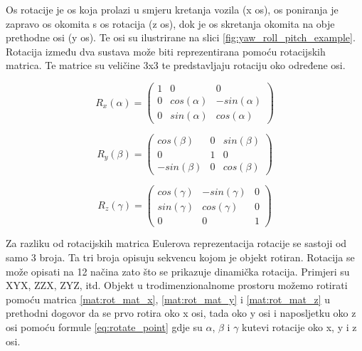 Os rotacije je os koja prolazi u smjeru kretanja vozila (x os), os poniranja je zapravo os okomita s os rotacija (z os), dok je os skretanja okomita na obje prethodne osi (y os). Te osi su ilustrirane na slici \ref{fig:yaw_roll_pitch_example}. Rotacija između dva sustava može biti reprezentirana pomoću rotacijskih matrica\cite{wiki:Rotation_matrix}. Te matrice su veličine 3x3 te predstavljaju rotaciju oko određene osi.
\pagebreak

\begin{equation}
  R_{x}(\alpha) =
  \begin{pmatrix}
    1 & 0 & 0\\
    0 & cos(\alpha) & -sin(\alpha)\\
    0 & sin(\alpha) & cos(\alpha)
  \end{pmatrix}
  \label{mat:rot_mat_x}
\end{equation}

\begin{equation}
  R_{y}(\beta) =
  \begin{pmatrix}
    cos(\beta) & 0 & sin(\beta)\\
    0 & 1 & 0\\
    -sin(\beta) & 0 & cos(\beta)
  \end{pmatrix}
  \label{mat:rot_mat_y}
\end{equation}

\begin{equation}
  R_{z}(\gamma) =
  \begin{pmatrix}
    cos(\gamma) & -sin(\gamma) & 0\\
    sin(\gamma) & cos(\gamma) & 0\\
    0 & 0 & 1
  \end{pmatrix}
  \label{mat:rot_mat_z}
\end{equation}

Za razliku od rotacijskih matrica Eulerova reprezentacija rotacije se sastoji od samo 3 broja. Ta tri broja opisuju sekvencu kojom je objekt rotiran. Rotacija se može opisati na 12 načina zato što se prikazuje dinamička rotacija. Primjeri su XYX, ZZX, ZYZ, itd. Objekt u trodimenzionalnome prostoru možemo rotirati pomoću matrica \ref{mat:rot_mat_x}, \ref{mat:rot_mat_y} i \ref{mat:rot_mat_z} u prethodni dogovor da se prvo rotira oko x osi, tada oko y osi i naposljetku oko z osi pomoću formule \ref{eq:rotate_point} gdje su $\alpha$, $\beta$ i $\gamma$ kutevi rotacije oko x, y i z osi.

